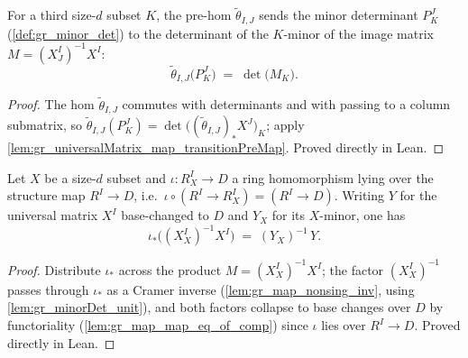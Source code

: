 \begin{lemma}

  \label{lem:gr_transitionPreMap_minorDet}
  For a third size-\(d\) subset \(K\), the pre-hom \(\tilde\theta_{I,J}\) sends the
  minor determinant \(P^J_K\) (\cref{def:gr_minor_det}) to the determinant of the
  \(K\)-minor of the image matrix \(M = (X^I_J)^{-1} X^I\):
  \[
    \tilde\theta_{I,J}\bigl(P^J_K\bigr) \;=\; \det\bigl(M_K\bigr).
  \]
\end{lemma}
\begin{proof}

\leanok
  The hom \(\tilde\theta_{I,J}\) commutes with determinants and with passing to
  a column submatrix, so \(\tilde\theta_{I,J}(P^J_K) =
  \det\bigl((\tilde\theta_{I,J})_\ast X^J\bigr)_K\); apply
  \cref{lem:gr_universalMatrix_map_transitionPreMap}. Proved directly in Lean.
\end{proof}

\begin{lemma}

  \label{lem:gr_imageMatrix_map_eq}
  Let \(X\) be a size-\(d\) subset and \(\iota : R^I_X \to D\) a ring
  homomorphism lying over the structure map \(R^I \to D\), i.e.\
  \(\iota \circ (R^I \to R^I_X) = (R^I \to D)\). Writing \(Y\) for the universal
  matrix \(X^I\) base-changed to \(D\) and \(Y_X\) for its \(X\)-minor, one has
  \[
    \iota_\ast\bigl((X^I_X)^{-1} X^I\bigr) \;=\; (Y_X)^{-1}\, Y .
  \]
\end{lemma}
\begin{proof}

\leanok
  Distribute \(\iota_\ast\) across the product \(M = (X^I_X)^{-1} X^I\); the
  factor \((X^I_X)^{-1}\) passes through \(\iota_\ast\) as a Cramer inverse
  (\cref{lem:gr_map_nonsing_inv}, using \cref{lem:gr_minorDet_unit}), and both
  factors collapse to base changes over \(D\) by functoriality
  (\cref{lem:gr_map_map_eq_of_comp}) since \(\iota\) lies over \(R^I \to D\).
  Proved directly in Lean.
\end{proof}

